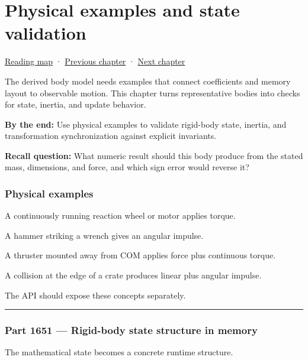 \hypertarget{06-engine-ii-ch037}{}
\chapter{Physical examples and state validation}\label{stagechapter:06-engine-ii-ch037}\label{06-engine-ii-ch037-physical-examples-and-state-validation}

\hyperref[volume-reading-map]{Reading map} · \hyperref[06-engine-ii-ch036-auditing-capsule-mass-properties-and-collision-formulas]{Previous chapter} · \hyperref[06-engine-ii-ch038-integrator-choices-and-energy-drift]{Next chapter}

The derived body model needs examples that connect coefficients and memory layout to observable motion. This chapter turns representative bodies into checks for state, inertia, and update behavior.

\textbf{By the end:} Use physical examples to validate rigid-body state, inertia, and transformation synchronization against explicit invariants.

\textbf{Recall question:} What numeric result should this body produce from the stated mass, dimensions, and force, and which sign error would reverse it?

\subsection{Physical examples}\label{06-engine-ii-ch037-physical-examples}

A continuously running reaction wheel or motor applies torque.

A hammer striking a wrench gives an angular impulse.

A thruster mounted away from COM applies force plus continuous torque.

A collision at the edge of a crate produces linear plus angular impulse.

The API should expose these concepts separately.

\begin{center}\rule{0.5\linewidth}{0.5pt}\end{center}

\subsection{Part 1651 --- Rigid-body state structure in memory}\label{06-engine-ii-ch037-part-1651-rigid-body-state-structure-in-memory}

The mathematical state becomes a concrete runtime structure.

